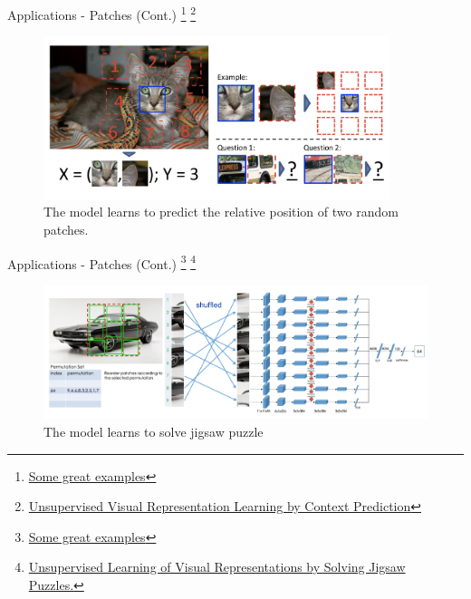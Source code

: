 \documentclass[serif, aspectratio=169]{beamer}
\begin{document}
\begin{frame}{Applications - Patches (Cont.)
\footnote{\href{https://www.cnblogs.com/wangxiaocvpr/p/11838766.html}{Some great examples}}
\footnote{\href{https://arxiv.org/abs/1505.05192}{Unsupervised Visual Representation Learning by Context Prediction}}}    
    \begin{figure}
        \setlength{\abovecaptionskip}{0pt}
        \setlength{\belowcaptionskip}{1pt}
        \centering
        \includegraphics[width=0.9\textwidth]{pic/ssl-applications/patches.png}
        \caption{The model learns to predict the relative position of two random patches.}
   \end{figure}
\end{frame}


\begin{frame}{Applications - Patches (Cont.)
\footnote{\href{https://www.cnblogs.com/wangxiaocvpr/p/11838766.html}{Some great examples}}
\footnote{\href{https://arxiv.org/abs/1603.09246}{Unsupervised Learning of Visual Representations by Solving Jigsaw Puzzles.}}}    
    \begin{figure}
        \setlength{\abovecaptionskip}{0pt}
        \setlength{\belowcaptionskip}{1pt}
        \centering
        \includegraphics[width=\textwidth]{pic/ssl-applications/patches2.png}
        \caption{The model learns to solve jigsaw puzzle}
   \end{figure}
\end{frame}
\end{document}
